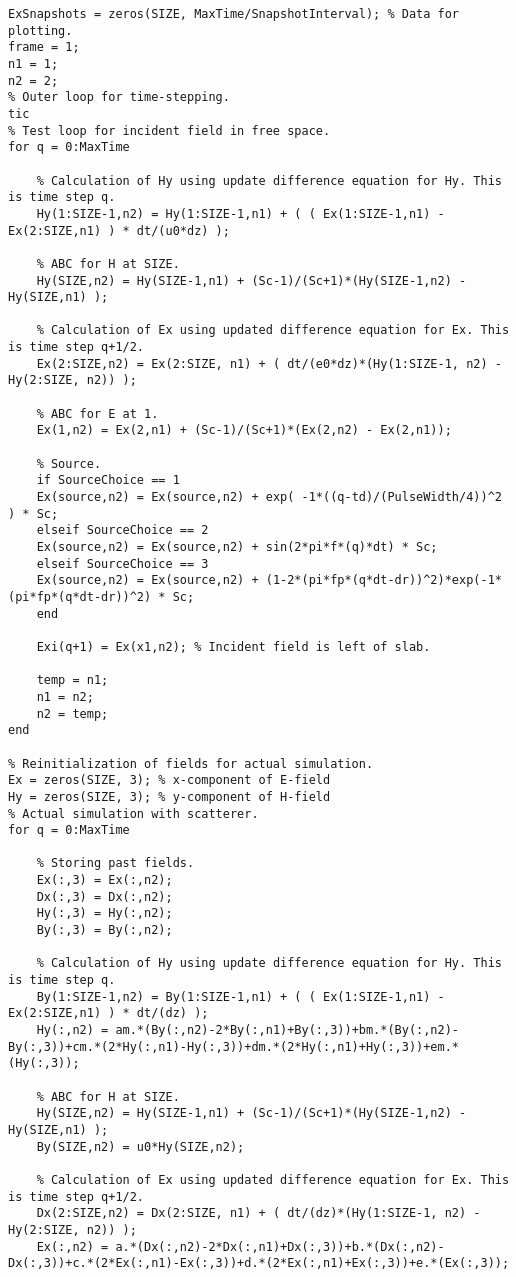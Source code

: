 \begin{lstlisting}
ExSnapshots = zeros(SIZE, MaxTime/SnapshotInterval); % Data for plotting.
frame = 1;
n1 = 1;
n2 = 2;
% Outer loop for time-stepping.
tic
% Test loop for incident field in free space.
for q = 0:MaxTime
   
    % Calculation of Hy using update difference equation for Hy. This is time step q.
    Hy(1:SIZE-1,n2) = Hy(1:SIZE-1,n1) + ( ( Ex(1:SIZE-1,n1) - Ex(2:SIZE,n1) ) * dt/(u0*dz) );
        
    % ABC for H at SIZE.
    Hy(SIZE,n2) = Hy(SIZE-1,n1) + (Sc-1)/(Sc+1)*(Hy(SIZE-1,n2) - Hy(SIZE,n1) );

    % Calculation of Ex using updated difference equation for Ex. This is time step q+1/2.
    Ex(2:SIZE,n2) = Ex(2:SIZE, n1) + ( dt/(e0*dz)*(Hy(1:SIZE-1, n2) - Hy(2:SIZE, n2)) );
    
    % ABC for E at 1.
    Ex(1,n2) = Ex(2,n1) + (Sc-1)/(Sc+1)*(Ex(2,n2) - Ex(2,n1));
    
    % Source.
    if SourceChoice == 1
    Ex(source,n2) = Ex(source,n2) + exp( -1*((q-td)/(PulseWidth/4))^2 ) * Sc;
    elseif SourceChoice == 2
    Ex(source,n2) = Ex(source,n2) + sin(2*pi*f*(q)*dt) * Sc;
    elseif SourceChoice == 3
    Ex(source,n2) = Ex(source,n2) + (1-2*(pi*fp*(q*dt-dr))^2)*exp(-1*(pi*fp*(q*dt-dr))^2) * Sc;
    end
    
    Exi(q+1) = Ex(x1,n2); % Incident field is left of slab.
    
    temp = n1;
    n1 = n2;
    n2 = temp;
end

% Reinitialization of fields for actual simulation.
Ex = zeros(SIZE, 3); % x-component of E-field
Hy = zeros(SIZE, 3); % y-component of H-field
% Actual simulation with scatterer.
for q = 0:MaxTime
    
    % Storing past fields.
    Ex(:,3) = Ex(:,n2);
    Dx(:,3) = Dx(:,n2);
    Hy(:,3) = Hy(:,n2);
    By(:,3) = By(:,n2);
    
    % Calculation of Hy using update difference equation for Hy. This is time step q.
    By(1:SIZE-1,n2) = By(1:SIZE-1,n1) + ( ( Ex(1:SIZE-1,n1) - Ex(2:SIZE,n1) ) * dt/(dz) );
    Hy(:,n2) = am.*(By(:,n2)-2*By(:,n1)+By(:,3))+bm.*(By(:,n2)-By(:,3))+cm.*(2*Hy(:,n1)-Hy(:,3))+dm.*(2*Hy(:,n1)+Hy(:,3))+em.*(Hy(:,3));
    
    % ABC for H at SIZE.
    Hy(SIZE,n2) = Hy(SIZE-1,n1) + (Sc-1)/(Sc+1)*(Hy(SIZE-1,n2) - Hy(SIZE,n1) );
    By(SIZE,n2) = u0*Hy(SIZE,n2);

    % Calculation of Ex using updated difference equation for Ex. This is time step q+1/2.
    Dx(2:SIZE,n2) = Dx(2:SIZE, n1) + ( dt/(dz)*(Hy(1:SIZE-1, n2) - Hy(2:SIZE, n2)) );
    Ex(:,n2) = a.*(Dx(:,n2)-2*Dx(:,n1)+Dx(:,3))+b.*(Dx(:,n2)-Dx(:,3))+c.*(2*Ex(:,n1)-Ex(:,3))+d.*(2*Ex(:,n1)+Ex(:,3))+e.*(Ex(:,3));
    

\end{lstlisting}
